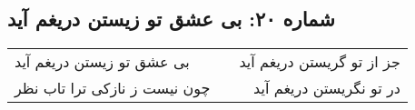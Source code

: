\begin{center}
\section*{شماره ۲۰: بی عشق تو زیستن دریغم آید}
\label{sec:020}
\begin{longtable}{l p{0.5cm} r}
بی عشق تو زیستن دریغم آید
&&
جز از تو گریستن دریغم آید
\\
چون نیست ز نازکی ترا تاب نظر
&&
در تو نگریستن دریغم آید
\\
\end{longtable}
\end{center}
